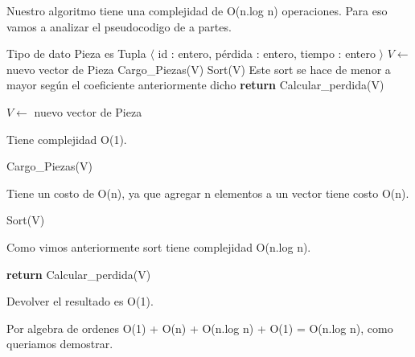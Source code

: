 Nuestro algoritmo tiene una complejidad de O(n.log n) operaciones. Para eso vamos a analizar el pseudocodigo de a partes.

\begin{pseudo}
\State Tipo de dato Pieza es Tupla $\langle$ id : entero, pérdida : entero, tiempo : entero $\rangle$
        \State $V \leftarrow$ nuevo vector de Pieza %
        \State Cargo\_Piezas(V) %
        \State Sort(V) %
        \Comment Este sort se hace de menor a mayor según el coeficiente anteriormente dicho
        \State \textbf{return} Calcular\_perdida(V) %
    \EndProcedure
\end{pseudo}

\begin{pseudo}
 \State  $V \leftarrow$ nuevo vector de Pieza
\end{pseudo}

Tiene complejidad O(1).

\begin{pseudo}
 \State Cargo\_Piezas(V)
\end{pseudo}

Tiene un costo de O(n), ya que agregar n elementos a un vector tiene costo O(n).

\begin{pseudo}
 \State Sort(V) 
\end{pseudo}

Como vimos anteriormente sort tiene complejidad O(n.log n).

\begin{pseudo}
 \State \textbf{return} Calcular\_perdida(V)
\end{pseudo}

Devolver el resultado es O(1).

Por algebra de ordenes O(1) + O(n) + O(n.log n) + O(1) = O(n.log n), como queriamos demostrar.